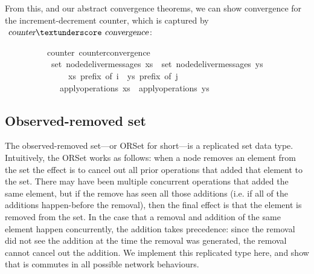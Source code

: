 \vspace{0.375em}
From this, and our abstract convergence theorems, we can show convergence for the increment-decrement counter, which is captured by $\isa{counter}{\isacharunderscore}\isa{convergence}$:
\vspace{0.375em}
\begin{isabellebody}
\ \ \ \ \ \ \ \ \ {\isacharparenleft}\ counter{\isacharparenright}\ counter{\isacharunderscore}convergence{\isacharcolon}\isanewline
\ \ \ \ \ \ \ \ \ \ \ {\isachardoublequoteopen}set\ {\isacharparenleft}node{\isacharunderscore}deliver{\isacharunderscore}messages\ xs{\isacharparenright}\ {\isacharequal}\ set\ {\isacharparenleft}node{\isacharunderscore}deliver{\isacharunderscore}messages\ ys{\isacharparenright}{\isachardoublequoteclose}\isanewline
\ \ \ \ \ \ \ \ \ \ \ \ \ \ \ {\isachardoublequoteopen}xs\ prefix\ of\ i{\isachardoublequoteclose}\ \ {\isachardoublequoteopen}ys\ prefix\ of\ j{\isachardoublequoteclose}\isanewline
\ \ \ \ \ \ \ \ \ \ \ \ \ {\isachardoublequoteopen}apply{\isacharunderscore}operations\ xs\ {\isacharequal}\ apply{\isacharunderscore}operations\ ys{\isachardoublequoteclose}
\end{isabellebody}

\subsection{Observed-removed set}
\label{subsect.observed-removed.set}

The observed-removed set---or ORSet for short---is a replicated set data type.
Intuitively, the ORSet works as follows: when a node removes an element from the set the effect is to cancel out all prior operations that added that element to the set.
There may have been multiple concurrent operations that added the same element, but if the remove has seen all those additions (i.e. if all of the additions happen-before the removal), then the final effect is that the element is removed from the set.
In the case that a removal and addition of the same element happen concurrently, the addition takes precedence: since the removal did not see the addition at the time the removal was generated, the removal cannot cancel out the addition.
We implement this replicated type here, and show that is commutes in all possible network behaviours.

